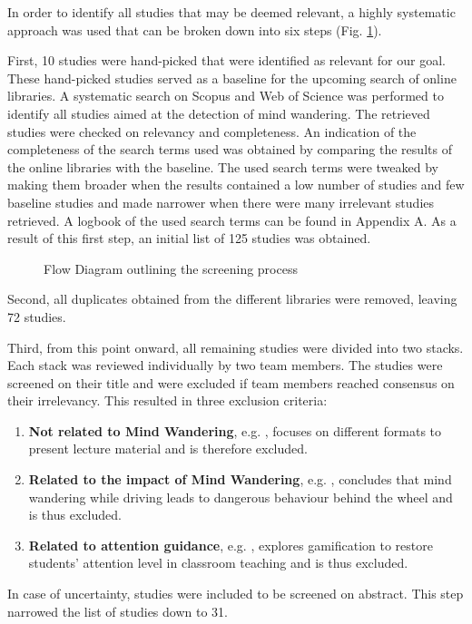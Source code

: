 
In order to identify all studies that may be deemed relevant, a highly systematic approach was used that can be broken down into six steps (Fig. \ref{fig:prisma}).

First, 10 studies were hand-picked that were identified as relevant for our goal. These hand-picked studies served as a baseline for the upcoming search of online libraries.
A systematic search on Scopus and Web of Science was performed to identify all studies aimed at the detection of mind wandering. The retrieved studies were checked on relevancy and completeness.
An indication of the completeness of the search terms used was obtained by comparing the results of the online libraries with the baseline. 
The used search terms were tweaked by making them broader when the results contained a low number of studies and few baseline studies and made narrower when there were many irrelevant studies retrieved.
A logbook of the used search terms can be found in Appendix A.
As a result of this first step, an initial list of 125 studies was obtained.

\begin{figure}
  \resizebox{\columnwidth}{!}{}
\caption{Flow Diagram outlining the screening process}
\label{fig:prisma}
\end{figure}

Second, all duplicates obtained from the different libraries were removed, leaving 72 studies.

Third, from this point onward, all remaining studies were divided into two stacks. Each stack was reviewed individually by two team members.
The studies were screened on their title and were excluded if team members reached consensus on their irrelevancy. 
This resulted in three exclusion criteria:
\begin{enumerate}
  \item \textbf{Not related to Mind Wandering}, e.g. \cite{ISI:000432512400017}, focuses on different formats to present lecture material and is therefore excluded.
  \item \textbf{Related to the impact of Mind Wandering}, e.g. \cite{Albert2018LinkingDrivers}, concludes that mind wandering while driving leads to dangerous behaviour behind the wheel and is thus excluded.
  \item \textbf{Related to attention guidance}, e.g. \cite{Xiao2018ClassroomMechanism}, explores gamification to restore students' attention level in classroom teaching and is thus excluded.  \end{enumerate}
In case of uncertainty, studies were included to be screened on abstract. This step narrowed the list of studies down to 31.


